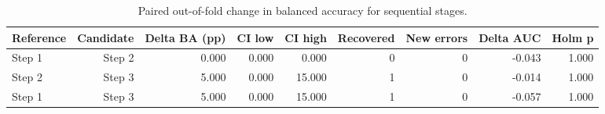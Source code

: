 \begin{table}[t]
\centering
\caption{Paired out-of-fold change in balanced accuracy for sequential stages.}
\label{tab:paired_stage_changes}
\footnotesize
\setlength{\tabcolsep}{4pt}
\begin{tabular}{lrrrrrrrr}
\toprule
Reference & Candidate & Delta BA (pp) & CI low & CI high & Recovered & New errors & Delta AUC & Holm p \\
\midrule
Step 1 & Step 2 & 0.000 & 0.000 & 0.000 & 0 & 0 & -0.043 & 1.000 \\
Step 2 & Step 3 & 5.000 & 0.000 & 15.000 & 1 & 0 & -0.014 & 1.000 \\
Step 1 & Step 3 & 5.000 & 0.000 & 15.000 & 1 & 0 & -0.057 & 1.000 \\
\bottomrule
\end{tabular}
\end{table}
